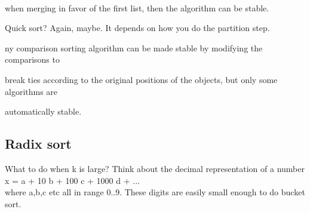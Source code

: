 \documentclass[a4paper,11pt]{article}
\begin{document}
\begin{flushleft}
\begin{itemize}
{\\ when merging in favor of the first list, then the algorithm can be stable.
\item
 Quick sort? Again, maybe. It depends on how you do the partition step.
\item
 ny comparison sorting algorithm can be made stable by modifying the comparisons to
}\end{itemize}
{
\raggedleft
break ties according to the original positions of the objects, but only some algorithms are
\\ }
{
automatically stable.
\\ \subsection{Radix sort}
What to do when k is large? Think about the decimal representation of a number
\\ x = a + 10 b + 100 c + 1000 d + ...
\\ where a,b,c etc all in range 0..9. These digits are easily small enough to do bucket sort.
}
\end{flushleft}
\newpage
\end{document}
